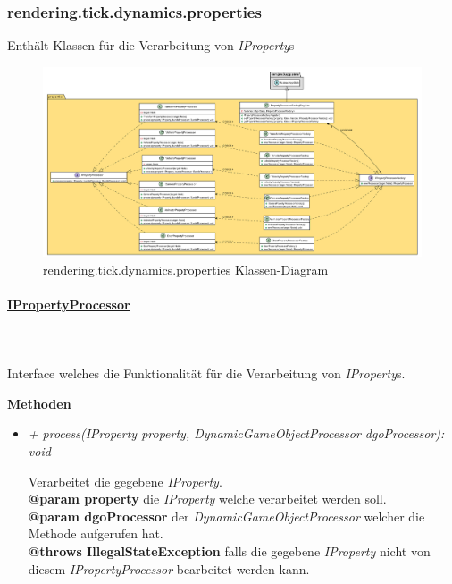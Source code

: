 \subsubsection{rendering.tick.dynamics.properties}
Enthält Klassen für die Verarbeitung von \textit{IProperty}s

    \begin{figure}[htbp]
        \centering
        \includegraphics[width=0.9\linewidth]{Interface/render-tick-dynamics-properties.png}
        \caption{rendering.tick.dynamics.properties Klassen-Diagram}
    \end{figure}

    \paragraph{\underline{IPropertyProcessor}} \mbox{}\\
    \\
    Interface welches die Funktionalität für die Verarbeitung von \textit{IProperty}s.\par

        \textbf{Methoden}
        \begin{itemize}
            \item  \textit{+ process(IProperty property, DynamicGameObjectProcessor dgoProcessor): void}
                \begin{leftbar}[0.9\linewidth]
                    Verarbeitet die gegebene \textit{IProperty}.\\
                    \textbf{@param property} die \textit{IProperty} welche verarbeitet werden soll.\\
                    \textbf{@param dgoProcessor} der \textit{DynamicGameObjectProcessor} welcher die Methode aufgerufen hat.\\
                    \textbf{@throws IllegalStateException} falls die gegebene \textit{IProperty} nicht von diesem \textit{IPropertyProcessor}
                    bearbeitet werden kann.
                \end{leftbar}
        \end{itemize}

